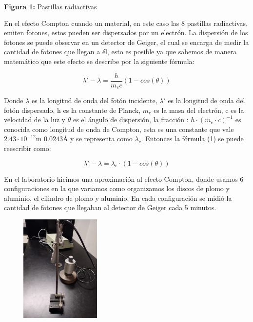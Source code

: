 \documentclass[a4paper]{article}
\begin{document}
    \begin{center}
        \textbf{Figura 1:} Pastillas radiactivas
    \end{center}



    \indent En el efecto Compton cuando un material, en este caso las 8 pastillas radiactivas, emiten fotones, estos pueden ser dispersados por un electrón. La dispersión de los fotones se puede observar en un detector de Geiger, el cual se encarga de medir la cantidad de fotones que llegan a él, esto es posible ya que sabemos de manera matemático que este efecto se describe por la siguiente fórmula:\\

    \begin{center}
        \begin{equation}
            \lambda' - \lambda = \frac{h}{m_e c} (1 - cos(\theta))
        \end{equation}
    \end{center}

    \indent Donde $\lambda$ es la longitud de onda del fotón incidente, $\lambda'$ es la longitud de onda del fotón dispersado, h es la constante de Planck, $m_e$ es la masa del electrón, c es la velocidad de la luz y $\theta$ es el ángulo de dispersión, la fracción : $h \cdot (m_e \cdot c)^{-1}$ es conocida como longitud de onda de Compton, esta es una constante que vale $2.43 \cdot 10^{-12}$m $0.0243$Å y se representa como $\lambda_c$. Entonces la fórmula (1) se puede reescribir como:\\

    \begin{center}
        \begin{equation}
            \lambda' - \lambda =  \lambda_c \cdot (1 - cos(\theta))
        \end{equation}
    \end{center}

    \indent En el laboratorio hicimos una aproximación al efecto Compton, donde usamos 6 configuraciones en la que variamos como organizamos los discos de plomo y aluminio, el cilindro de plomo y aluminio. En cada configuración se midió la cantidad de fotones que llegaban al detector de Geiger cada 5 minutos.\\

    \begin{figure}[h!]
        \centering
        \includegraphics[width=4cm]{../imagenes/labcomton.jpg}
    \end{figure}
\end{document}
